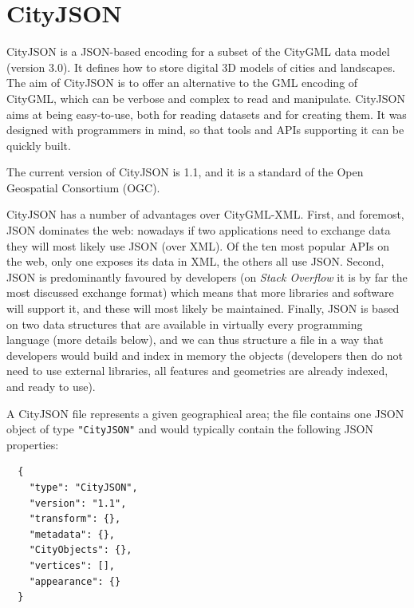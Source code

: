 \section{CityJSON}%

CityJSON is a JSON-based encoding 
for a subset of the  CityGML data model (version 3.0). 
It defines how to store digital 3D models of cities and landscapes. 
The aim of CityJSON is to offer an alternative to the GML encoding of CityGML, which can be verbose and complex to read and manipulate. 
CityJSON aims at being easy-to-use, both for reading datasets and for creating them. 
It was designed with programmers in mind, so that tools and APIs supporting it can be quickly built. 

%

The current version of CityJSON is 1.1, 
and it is a standard of the Open Geospatial Consortium (OGC).

%

CityJSON has a number of advantages over CityGML-XML\@.
First, and foremost, JSON dominates the web: nowadays if two applications need to exchange data they will most likely use JSON (over XML).
Of the ten most popular APIs on the web, only one exposes its data in XML, the others all use JSON\@.
Second, JSON is predominantly favoured by developers (on \emph{Stack Overflow} it is by far the most discussed exchange format) which means that more libraries and software will support it, and these will most likely be maintained.
Finally, JSON is based on two data structures that are available in virtually every programming language (more details below), and we can thus structure a file in a way that  developers would build and index in memory the objects (developers then do not need to use external libraries, all features and geometries are already indexed, and ready to use). 

%

A CityJSON file represents a given geographical area; the file contains one JSON object of type \texttt{"CityJSON"} and would typically contain the following JSON properties:
\begin{lstlisting}
  {
    "type": "CityJSON",
    "version": "1.1",
    "transform": {},
    "metadata": {},
    "CityObjects": {},
    "vertices": [],
    "appearance": {}
  }
\end{lstlisting}


